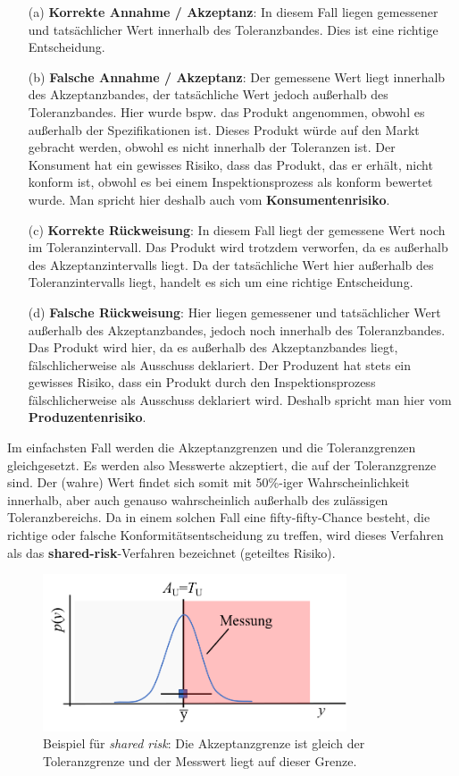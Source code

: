 \begin{itemize}
	\item[(a)] \textbf{Korrekte Annahme / Akzeptanz}: In diesem Fall liegen gemessener und tatsächlicher Wert innerhalb des Toleranzbandes. Dies ist eine richtige Entscheidung.
	\item[(b)] 	\textbf{Falsche Annahme / Akzeptanz}: Der gemessene Wert liegt innerhalb des Akzeptanzbandes, der tatsächliche Wert jedoch außerhalb des Toleranzbandes. Hier wurde bspw. das Produkt angenommen, obwohl es außerhalb der Spezifikationen ist. Dieses Produkt würde auf den Markt gebracht werden, obwohl es nicht innerhalb der Toleranzen ist. Der Konsument hat ein gewisses Risiko, dass das Produkt, das er erhält, nicht konform ist, obwohl es bei einem Inspektionsprozess als konform bewertet wurde. Man spricht hier deshalb auch vom \textbf{Konsumentenrisiko}.
	\item[(c)] 	\textbf{Korrekte Rückweisung}: In diesem Fall liegt der gemessene Wert noch im Toleranzintervall. Das Produkt wird trotzdem verworfen, da es außerhalb des Akzeptanzintervalls liegt. Da der tatsächliche Wert hier außerhalb des Toleranzintervalls liegt, handelt es sich um eine richtige Entscheidung.
	\item[(d)] 	\textbf{Falsche Rückweisung}: Hier liegen gemessener und tatsächlicher Wert außerhalb des Akzeptanzbandes, jedoch noch innerhalb des Toleranzbandes. Das Produkt wird hier, da es außerhalb des Akzeptanzbandes liegt, fälschlicherweise als Ausschuss deklariert. Der Produzent hat stets ein gewisses Risiko, dass ein Produkt durch den Inspektionsprozess fälschlicherweise als Ausschuss deklariert wird. Deshalb spricht man hier vom \textbf{Produzentenrisiko}.
\end{itemize}
Im einfachsten Fall werden die Akzeptanzgrenzen und die Toleranzgrenzen gleichgesetzt. Es werden also Messwerte akzeptiert, die auf der Toleranzgrenze sind. Der (wahre) Wert findet sich somit mit 50\%-iger Wahrscheinlichkeit innerhalb, aber auch genauso
wahrscheinlich außerhalb des zulässigen Toleranzbereichs.
Da in einem solchen Fall eine fifty-fifty-Chance besteht, die
richtige oder falsche Konformitätsentscheidung zu treffen,
wird dieses Verfahren als das \textbf{shared-risk}-Verfahren
bezeichnet (geteiltes Risiko).

\begin{figure}[!htp]
	\begin{center}
		\includegraphics[width=90mm]{05_vorlesung/media/SharedRisk.png}
		\caption{\label{fig:shared_risk} Beispiel für \textsl{shared risk}: Die Akzeptanzgrenze ist gleich der Toleranzgrenze und der Messwert liegt auf dieser Grenze.}
	\end{center}
\end{figure}

